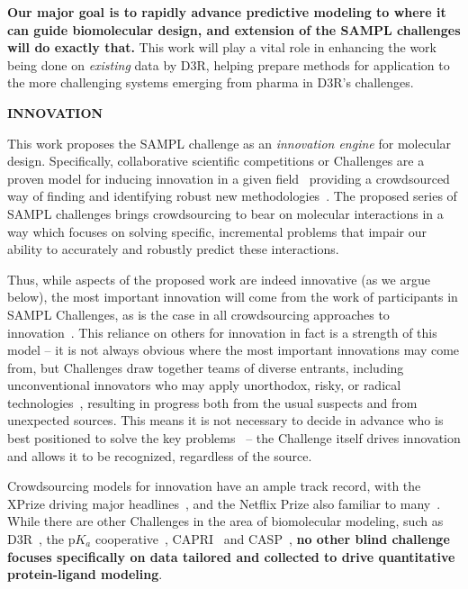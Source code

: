 \documentclass[11pt]{article}
\begin{document}
\textbf{Our major goal is to rapidly advance predictive modeling to where it can guide biomolecular design, and extension of the SAMPL challenges will do exactly that.} This work will play a vital role in enhancing the work being done on \emph{existing} data by D3R, helping prepare methods for application to the more challenging systems emerging from pharma in D3R's challenges. 

{\Large \bf INNOVATION}

This work proposes the SAMPL challenge as an \emph{innovation engine} for molecular design.
Specifically, collaborative scientific competitions or Challenges are a proven model for inducing innovation in a given field~\cite{Saez-Rodriguez:2016:NatRevGenet, Kay:2011:R&DManage, Eisenstein:2013:NatBiotech} providing a crowdsourced way of finding and identifying robust new methodologies~\cite{Saez-Rodriguez:2016:NatRevGenet}. 
The proposed series of SAMPL challenges brings crowdsourcing to bear on molecular interactions in a way which focuses on solving specific, incremental problems that impair our ability to accurately and robustly predict these interactions.

Thus, while aspects of the proposed work are indeed innovative (as we argue below), the most important innovation will come from the work of participants in SAMPL Challenges, as is the case in all crowdsourcing approaches to innovation~\cite{Saez-Rodriguez:2016:NatRevGenet, Kay:2011:R&DManage}.
This reliance on others for innovation in fact is a strength of this model -- it is not always obvious where the most important innovations may come from, but Challenges draw together teams of diverse entrants, including unconventional innovators who may apply unorthodox, risky, or radical technologies~\cite{Kay:2011:R&DManage, Saez-Rodriguez:2016:NatRevGenet,}, resulting in progress both from the usual suspects and from unexpected sources.
This means it is not necessary to decide in advance who is best positioned to solve the key problems~\cite{Saez-Rodriguez:2016:NatRevGenet,} -- the Challenge itself drives innovation and allows it to be recognized, regardless of the source.

Crowdsourcing models for innovation have an ample track record, with the XPrize driving major headlines~\cite{::XPRIZE, Kay:2011:R&DManage, XPrize:2017:Wikipedia}, and the Netflix Prize also familiar to many~\cite{Bell:2010:CHANCE}. 
While there are other Challenges in the area of biomolecular modeling, such as D3R~\cite{Gathiaka:2016:JComputAidedMolDes}, the p$K_a$ cooperative~\cite{Nielsen:2011:Proteins}, CAPRI~\cite{Janin:2005:ProteinScience} and CASP~\cite{Moult:2014:Proteins},
\textbf{no other blind challenge focuses specifically on data tailored and collected to drive quantitative protein-ligand modeling}.
\end{document}

